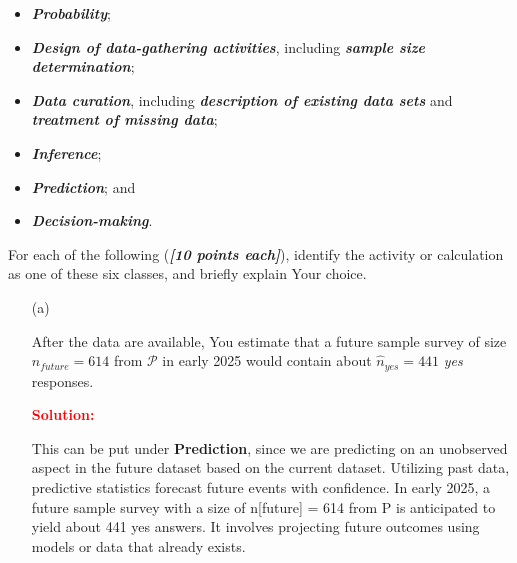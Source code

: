 \documentclass[12pt]{article}
\newcommand{\bi}[1]{\b{\i{#1}}}
\renewcommand{\b}[1]{\textbf{#1}}
\renewcommand{\i}[1]{\textit{#1}}
\begin{document}
\begin{itemize}
\begin{itemize}

\item

\bi{Probability};

\item

\bi{Design of data-gathering activities}, including \bi{sample size determination};

\item

\bi{Data curation}, including \bi{description of existing data sets} and \bi{treatment of missing data}; 

\item

\bi{Inference};

\item

\bi{Prediction}; and

\item

\bi{Decision-making}.

\end{itemize}

For each of the following (\bi{[10 points each]}), identify the activity or calculation as one of these six classes, and briefly explain Your choice.

\newenvironment{Solution3}[1]{%
    \leavevmode\color{#1}\ignorespaces%
}{%
}%
    

\begin{itemize}

\item[(a)]

After the data are available, You estimate that a future sample survey of size $n_{ future } = 614$ from $\mathcal{ P }$ in early 2025 would contain about $\hat{ n }_{ yes } = 441$ \textit{yes} responses.

\textbf{\textcolor{red}{Solution:}}
\begin{Solution3}{blue}
    This can be put under \textbf{Prediction}, since we are predicting on an unobserved aspect in the future dataset based on the current dataset. Utilizing past data, predictive statistics forecast future events with confidence.
In early 2025, a future sample survey with a size of n[future] = 614 from P is anticipated to yield about 441 yes answers. It involves projecting future outcomes using models or data that already exists.
\end{Solution3}


\end{itemize}
\end{itemize}
\end{document}
